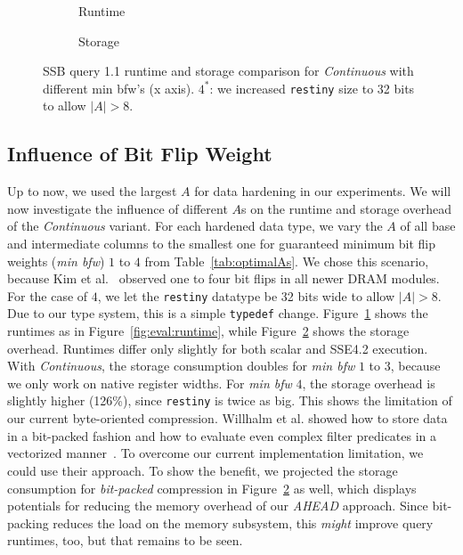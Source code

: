 \begin{figure}%
	\footnotesize
	\graphicspath{{results/ssb/}}
	\null
	\begin{subfigure}{1.4in}
		\vspace{-0.5em}
		\caption{Runtime}
		\label{fig:minbfw:runtime}
	\end{subfigure}
	\hfill
	\begin{subfigure}{1.7in}
		\vspace{-0.5em}
		\caption{Storage}
		\label{fig:minbfw:storage}
	\end{subfigure}
	\null
	\vspace{-1.5em}
	\caption{SSB query 1.1 runtime and storage comparison for \emph{Continuous} with different min bfw's (x axis). $4^*$: we increased \texttt{restiny} size to 32 bits to allow \(|A|>8\).}%
	\label{fig:minbfw}%
	\vspace{-0.5cm}
\end{figure}




\subsection{Influence of Bit Flip Weight}
Up to now, we used the largest \(A\) for data hardening in our experiments. We will now investigate the influence of different \(A\)s on the runtime and storage overhead of the \emph{Continuous} variant. For each hardened data type, we vary the \(A\) of all base and intermediate columns to the smallest one for guaranteed minimum bit flip weights (\emph{min bfw}) $1$ to $4$ from Table~\ref{tab:optimalAs}. We chose this scenario, because Kim et al.~\cite{DBLP:conf/isca/KimDKFLLWLM14} observed one to four bit flips in all newer DRAM modules. For the case of $4$, we let the \texttt{restiny} datatype be 32 bits wide to allow $|A|>8$. Due to our type system, this is a simple \texttt{typedef} change. Figure~\ref{fig:minbfw:runtime} shows the runtimes as in Figure~\ref{fig:eval:runtime}, while Figure~\ref{fig:minbfw:storage} shows the storage overhead. Runtimes differ only slightly for both scalar and SSE4.2 execution. With \emph{Continuous}, the storage consumption doubles for \emph{min bfw} $1$ to $3$, because we only work on native register widths. For \emph{min bfw} $4$, the storage overhead is slightly higher (126\%), since \texttt{restiny} is twice as big. This shows the limitation of our current byte-oriented compression. Willhalm et al. showed how to store data in a bit-packed fashion and how to evaluate even complex filter predicates in a vectorized manner~\cite{Willhalm:2009:SUF:1687627.1687671,willhalm2013vectorizing}. To overcome our current implementation limitation, we could use their approach. To show the benefit, we projected the storage consumption for \emph{bit-packed} compression in Figure~\ref{fig:minbfw:storage} as well, which displays potentials for reducing the memory overhead of our \emph{AHEAD} approach. Since bit-packing reduces the load on the memory subsystem, this \emph{might} improve query runtimes, too, but that remains to be seen.


